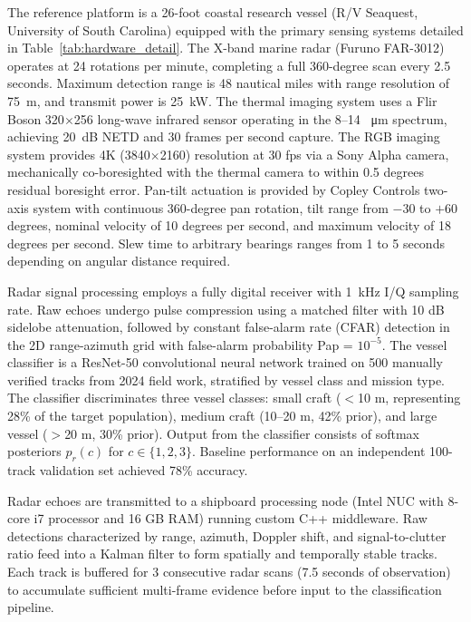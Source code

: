 \documentclass[conf]{asmeconf}
\begin{document}
The reference platform is a 26-foot coastal research vessel (R/V Seaquest, University of South Carolina) equipped with the primary sensing systems detailed in Table~\ref{tab:hardware_detail}. The X-band marine radar (Furuno FAR-3012) operates at 24 rotations per minute, completing a full 360-degree scan every 2.5 seconds. Maximum detection range is 48 nautical miles with range resolution of \SI{75}{m}, and transmit power is \SI{25}{kW}. The thermal imaging system uses a Flir Boson 320$\times$256 long-wave infrared sensor operating in the 8--14 \SI{}{\micro m} spectrum, achieving \SI{20}{dB} NETD and 30 frames per second capture. The RGB imaging system provides 4K (3840$\times$2160) resolution at 30 fps via a Sony Alpha camera, mechanically co-boresighted with the thermal camera to within 0.5 degrees residual boresight error. Pan-tilt actuation is provided by Copley Controls two-axis system with continuous 360-degree pan rotation, tilt range from $-30$ to $+60$ degrees, nominal velocity of 10 degrees per second, and maximum velocity of 18 degrees per second. Slew time to arbitrary bearings ranges from 1 to 5 seconds depending on angular distance required.

Radar signal processing employs a fully digital receiver with \SI{1}{kHz} I/Q sampling rate. Raw echoes undergo pulse compression using a matched filter with 10 dB sidelobe attenuation, followed by constant false-alarm rate (CFAR) detection in the 2D range-azimuth grid with false-alarm probability Pap = $10^{-5}$. The vessel classifier is a ResNet-50 convolutional neural network trained on 500 manually verified tracks from 2024 field work, stratified by vessel class and mission type. The classifier discriminates three vessel classes: small craft ($<$10 m, representing 28\% of the target population), medium craft (10--20 m, 42\% prior), and large vessel ($>$20 m, 30\% prior). Output from the classifier consists of softmax posteriors $p_r(c)$ for $c \in \{1,2,3\}$. Baseline performance on an independent 100-track validation set achieved 78\% accuracy.

Radar echoes are transmitted to a shipboard processing node (Intel NUC with 8-core i7 processor and 16 GB RAM) running custom C++ middleware. Raw detections characterized by range, azimuth, Doppler shift, and signal-to-clutter ratio feed into a Kalman filter \cite{Welch1995Kalman} to form spatially and temporally stable tracks. Each track is buffered for 3 consecutive radar scans (7.5 seconds of observation) to accumulate sufficient multi-frame evidence before input to the classification pipeline.
\end{document}
